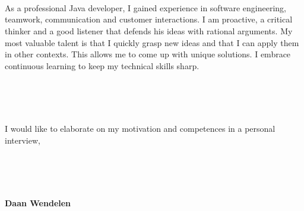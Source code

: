 \documentclass[10pt,a4paper,arial]{moderncv}        %
\begin{document}
~\\
~\\
~


As a professional Java developer, I gained experience in software engineering, teamwork, communication and customer interactions.
I am proactive, a critical thinker and a good listener that defends his ideas with rational arguments.
My most valuable talent is that I quickly grasp new ideas and that I can apply them in other contexts. This allows me to come up with unique solutions.
I embrace continuous learning to keep my technical skills sharp.


~\\
~\\
~

I would like to elaborate on my motivation and competences in a personal interview,

~\\
~\\
~

\textbf {Daan Wendelen}

\makeletterclosing
\end{document}
